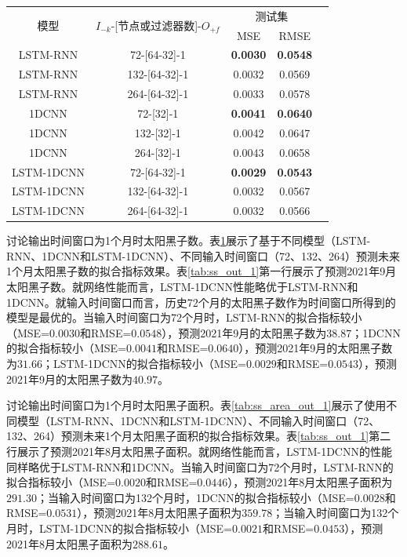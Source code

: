 \begin{table}[!htbp]
  \centering
  \label{tab:ss_number_out_1}
  \footnotesize
  \renewcommand{\arraystretch}{1}
  \begin{tabular}{ccccc}
    \toprule
    \multirow{2}{*}{模型} & \multirow{2}{*}{$I_{-k}$-[节点或过滤器数]-$O_{+f}$} & \multicolumn{2}{c}{测试集}\\
    \cmidrule(lr){3-4}
    \noalign{\smallskip}
    & & MSE & RMSE\\
    \midrule 
    LSTM-RNN & 72-[64-32]-1 & \textbf{0.0030} & \textbf{0.0548} \\
    LSTM-RNN & 132-[64-32]-1 & 0.0032 & 0.0569 \\
    LSTM-RNN & 264-[64-32]-1 & 0.0033 & 0.0578 \\
    \hline
    1DCNN & 72-[32]-1 & \textbf{0.0041} & \textbf{0.0640} \\
    1DCNN & 132-[32]-1 & 0.0042 & 0.0647 \\
    1DCNN & 264-[32]-1 & 0.0043 & 0.0658 \\
    \hline
    LSTM-1DCNN & 72-[64-32]-1 & \textbf{0.0029} & \textbf{0.0543} \\
    LSTM-1DCNN & 132-[64-32]-1 & 0.0032 & 0.0567 \\
    LSTM-1DCNN & 264-[64-32]-1 & 0.0032 & 0.0566 \\
    \bottomrule
  \end{tabular}
\end{table}

讨论输出时间窗口为1个月时太阳黑子数。表\ref{tab:ss_number_out_1}展示了基于不同模型（LSTM-RNN、1DCNN和LSTM-1DCNN）、不同输入时间窗口（72、132、264）预测未来1个月太阳黑子数的拟合指标效果。表\ref{tab:ss_out_1}第一行展示了预测2021年9月太阳黑子数。就网络性能而言，LSTM-1DCNN性能略优于LSTM-RNN和1DCNN。就输入时间窗口而言，历史72个月的太阳黑子数作为时间窗口所得到的模型是最优的。当输入时间窗口为72个月时，LSTM-RNN的拟合指标较小（MSE=$0.0030$和RMSE=$0.0548$），预测2021年9月的太阳黑子数为$38.87$；1DCNN的拟合指标较小（MSE=$0.0041$和RMSE=$0.0640$），预测2021年9月的太阳黑子数为$31.66$；LSTM-1DCNN的拟合指标较小（MSE=$0.0029$和RMSE=$0.0543$），预测2021年9月的太阳黑子数为$40.97$。

讨论输出时间窗口为1个月时太阳黑子面积。表\ref{tab:ss_area_out_1}展示了使用不同模型（LSTM-RNN、1DCNN和LSTM-1DCNN）、不同输入时间窗口（72、132、264）预测未来1个月太阳黑子面积的拟合指标效果。表\ref{tab:ss_out_1}第二行展示了预测2021年8月太阳黑子面积。就网络性能而言，LSTM-1DCNN的性能同样略优于LSTM-RNN和1DCNN。当输入时间窗口为72个月时，LSTM-RNN的拟合指标较小（MSE=$0.0020$和RMSE=$0.0446$），预测2021年8月太阳黑子面积为$291.30$；当输入时间窗口为132个月时，1DCNN的拟合指标较小（MSE=$0.0028$和RMSE=$0.0531$），预测2021年8月太阳黑子面积为$359.78$；当输入时间窗口为132个月时，LSTM-1DCNN的拟合指标较小（MSE=$0.0021$和RMSE=$0.0453$），预测2021年8月太阳黑子面积为$288.61$。

